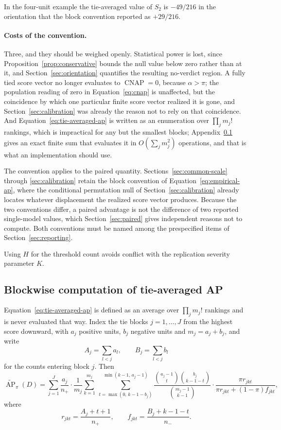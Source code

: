 \documentclass[11pt]{article}
\newcommand{\AP}{\operatorname{AP}}
\newcommand{\CNAP}{\operatorname{CNAP}}
\newcommand{\APta}{\widetilde{\AP}}
\theoremstyle{remark}
\begin{document}
In the four-unit example the tie-averaged value of $S_2$ is $-49/216$ in the orientation that the block convention reported as $+29/216$.

\paragraph{Costs of the convention.}
Three, and they should be weighed openly. Statistical power is lost, since Proposition~\ref{prop:conservative} bounds the null value below zero rather than at it, and Section~\ref{sec:orientation} quantifies the resulting no-verdict region. A fully tied score vector no longer evaluates to $\CNAP=0$, because $\alpha>\pi$; the population reading of zero in Equation~\eqref{eq:cnap} is unaffected, but the coincidence by which one particular finite score vector realized it is gone, and Section~\ref{sec:calibration} was already the reason not to rely on that coincidence. And Equation~\eqref{eq:tie-averaged-ap} is written as an enumeration over $\prod_j m_j!$ rankings, which is impractical for any but the smallest blocks; Appendix~\ref{app:tie-computation} gives an exact finite sum that evaluates it in $O(\sum_j m_j^2)$ operations, and that is what an implementation should use.

The convention applies to the paired quantity. Sections~\ref{sec:common-scale} through \ref{sec:calibration} retain the block convention of Equation~\eqref{eq:empirical-ap}, where the conditional permutation null of Section~\ref{sec:calibration} already locates whatever displacement the realized score vector produces. Because the two conventions differ, a paired advantage is not the difference of two reported single-model values, which Section~\ref{sec:paired} gives independent reasons not to compute. Both conventions must be named among the prespecified items of Section~\ref{sec:reporting}.

Using $H$ for the threshold count avoids conflict with the replication severity parameter $K$.

\subsection{Blockwise computation of tie-averaged AP}
\label{app:tie-computation}

Equation~\eqref{eq:tie-averaged-ap} is defined as an average over $\prod_j m_j!$ rankings and is never evaluated that way. Index the tie blocks $j=1,\ldots,J$ from the highest score downward, with $a_j$ positive units, $b_j$ negative units and $m_j=a_j+b_j$, and write
\[
A_j=\sum_{l<j}a_l,
\qquad
B_j=\sum_{l<j}b_l
\]
for the counts entering block $j$. Then
\begin{equation}
\APta_\pi(D)
=
\sum_{j=1}^{J}
\frac{a_j}{n_+}
\cdot
\frac{1}{m_j}
\sum_{k=1}^{m_j}
\ \sum_{t=\max(0,\,k-1-b_j)}^{\min(k-1,\,a_j-1)}
\frac{\binom{a_j-1}{t}\binom{b_j}{k-1-t}}{\binom{m_j-1}{k-1}}
\cdot
\frac{\pi r_{jkt}}
{\pi r_{jkt}+(1-\pi)f_{jkt}},
\label{eq:tie-averaged-closed}
\end{equation}
where
\[
r_{jkt}=\frac{A_j+t+1}{n_+},
\qquad
f_{jkt}=\frac{B_j+k-1-t}{n_-}.
\]
\end{document}
